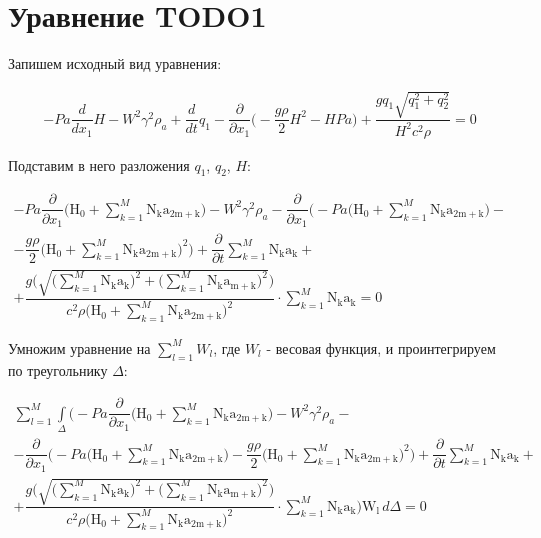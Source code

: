 \documentclass[14pt]{extreport}
\begin{document}
\section{Уравнение TODO1}

Запишем исходный вид уравнения:

\begin{multline*}
- Pa \dfrac{d}{d x_{1}} H - W^{2} \gamma^{2} \rho_{a} + \dfrac{d}{d t} q_{1} - \dfrac{\partial}{\partial x_{1}}\bigg(- \dfrac{g \rho}{2} H^{2} - H Pa\bigg) + \dfrac{g q_{1} \sqrt{q_{1}^{2} + q_{2}^{2}}}{H^{2} c^{2} \rho}=0
\end{multline*}

Подставим в него разложения $q_1$, $q_2$, $H$:

\begin{multline*}
- Pa \dfrac{\partial}{\partial x_{1}} \bigg(\operatorname{H_{0}} + \sum_{k=1}^{M} \operatorname{N_{k}} \operatorname{a_{2m+k}}\bigg) - W^{2} \gamma^{2} \rho_{a} - \dfrac{\partial}{\partial x_{1}}\bigg(- Pa \bigg(\operatorname{H_{0}} + \sum\limits_{k=1}^{M} \operatorname{N_{k}} \operatorname{a_{2m+k}}\bigg) -\\- \dfrac{g \rho}{2} \bigg(\operatorname{H_{0}} + \sum\limits_{k=1}^{M} \operatorname{N_{k}} \operatorname{a_{2m+k}}\bigg)^{2}\bigg) + \dfrac{\partial}{\partial t} \sum\limits_{k=1}^{M} \operatorname{N_{k}} \operatorname{a_{k}} +\\+ \dfrac{g \bigg(\sqrt{\bigg(\sum\limits_{k=1}^{M} \operatorname{N_{k}} \operatorname{a_{k}}\bigg)^{2} + \bigg(\sum\limits_{k=1}^{M} \operatorname{N_{k}} \operatorname{a_{m+k}}\bigg)^{2}}\bigg)}{c^{2} \rho \bigg(\operatorname{H_{0}} + \sum\limits_{k=1}^{M} \operatorname{N_{k}} \operatorname{a_{2m+k}}\bigg)^{2}} \cdot \sum\limits_{k=1}^{M} \operatorname{N_{k}} \operatorname{a_{k}} = 0
\end{multline*}

Умножим уравнение на $\sum\limits_{l=1}^{M} W_l$, где $W_l$ - весовая функция, и проинтегрируем по треугольнику $\Delta$:

\begin{multline*}
\sum_{l=1}^{M} \int\limits_{\Delta} \bigg(- Pa \dfrac{\partial}{\partial x_{1}}\bigg(\operatorname{H_{0}} + \sum_{k=1}^{M} \operatorname{N_{k}} \operatorname{a_{2m+k}}\bigg) - W^{2} \gamma^{2} \rho_{a} -\\- \dfrac{\partial}{\partial x_{1}}\bigg(- Pa \bigg(\operatorname{H_{0}} + \sum\limits_{k=1}^{M} \operatorname{N_{k}} \operatorname{a_{2m+k}}\bigg) - \dfrac{g \rho}{2} \bigg(\operatorname{H_{0}} + \sum_{k=1}^{M} \operatorname{N_{k}} \operatorname{a_{2m+k}}\bigg)^{2}\bigg) + \dfrac{\partial}{\partial t} \sum\limits_{k=1}^{M} \operatorname{N_{k}} \operatorname{a_{k}} +\\+ \dfrac{g \bigg(\sqrt{\bigg(\sum\limits_{k=1}^{M} \operatorname{N_{k}} \operatorname{a_{k}}\bigg)^{2} + \bigg(\sum\limits_{k=1}^{M} \operatorname{N_{k}} \operatorname{a_{m+k}}\bigg)^{2}}\bigg)}{c^{2} \rho \bigg(\operatorname{H_{0}} + \sum\limits_{k=1}^{M} \operatorname{N_{k}} \operatorname{a_{2m+k}}\bigg)^{2}} \cdot \sum\limits_{k=1}^{M} \operatorname{N_{k}} \operatorname{a_{k}}\bigg) \operatorname{W_{l}}\, d\Delta = 0
\end{multline*}
\end{document}

